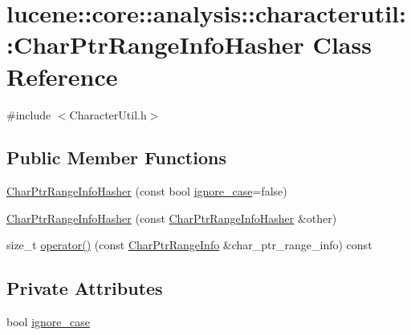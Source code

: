 \hypertarget{classlucene_1_1core_1_1analysis_1_1characterutil_1_1CharPtrRangeInfoHasher}{}\section{lucene\+:\+:core\+:\+:analysis\+:\+:characterutil\+:\+:Char\+Ptr\+Range\+Info\+Hasher Class Reference}
\label{classlucene_1_1core_1_1analysis_1_1characterutil_1_1CharPtrRangeInfoHasher}


{\ttfamily \#include $<$Character\+Util.\+h$>$}

\subsection*{Public Member Functions}
\begin{DoxyCompactItemize}
\item 
\mbox{\hyperlink{classlucene_1_1core_1_1analysis_1_1characterutil_1_1CharPtrRangeInfoHasher_a71f2afabf27326e4001429bfb58047fd}{Char\+Ptr\+Range\+Info\+Hasher}} (const bool \mbox{\hyperlink{classlucene_1_1core_1_1analysis_1_1characterutil_1_1CharPtrRangeInfoHasher_aa4cf1eca81aa2b19e03c9a2560df0899}{ignore\+\_\+case}}=false)
\item 
\mbox{\hyperlink{classlucene_1_1core_1_1analysis_1_1characterutil_1_1CharPtrRangeInfoHasher_a7427a4eabe1dd1c10cb327509d4595fd}{Char\+Ptr\+Range\+Info\+Hasher}} (const \mbox{\hyperlink{classlucene_1_1core_1_1analysis_1_1characterutil_1_1CharPtrRangeInfoHasher}{Char\+Ptr\+Range\+Info\+Hasher}} \&other)
\item 
size\+\_\+t \mbox{\hyperlink{classlucene_1_1core_1_1analysis_1_1characterutil_1_1CharPtrRangeInfoHasher_a2118b191b9a974e05872a5b3a562802d}{operator()}} (const \mbox{\hyperlink{classlucene_1_1core_1_1analysis_1_1characterutil_1_1CharPtrRangeInfo}{Char\+Ptr\+Range\+Info}} \&char\+\_\+ptr\+\_\+range\+\_\+info) const
\end{DoxyCompactItemize}
\subsection*{Private Attributes}
\begin{DoxyCompactItemize}
\item 
bool \mbox{\hyperlink{classlucene_1_1core_1_1analysis_1_1characterutil_1_1CharPtrRangeInfoHasher_aa4cf1eca81aa2b19e03c9a2560df0899}{ignore\+\_\+case}}
\end{DoxyCompactItemize}


